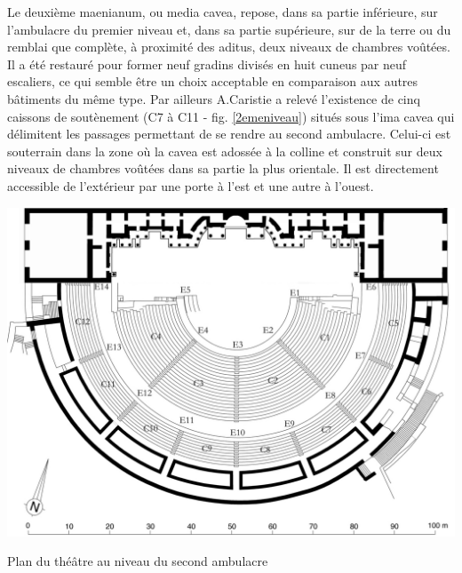 		
		Le deuxième \gls{maenianum}, ou  \gls{media cavea}, repose, dans sa partie inférieure, sur l'\gls{ambulacre} du premier niveau et, dans sa partie supérieure, sur de la terre ou du remblai que complète, à proximité des \gls{aditus}, deux niveaux de chambres voûtées. Il a été restauré pour former neuf gradins divisés en huit \gls{cuneus} par neuf escaliers, ce qui semble être un choix acceptable en comparaison aux autres bâtiments du même type. Par ailleurs A.Caristie a relevé l'existence de cinq caissons de soutènement (C7 à C11 - fig. \ref{2emeniveau}) situés sous l'\gls{ima cavea} qui délimitent les passages permettant de se rendre au second \gls{ambulacre}. Celui-ci est souterrain dans la zone où la \gls{cavea} est adossée à la colline et construit sur deux niveaux de chambres voûtées dans sa partie la plus orientale. Il est directement accessible de l'extérieur par une porte à l'est et une autre à l'ouest.
		
	\begin{figureth}
		\includegraphics[width=\linewidth]{images/2emeniveau}
		\caption[Vue de dessus - 2ème niveau]{Plan du théâtre au niveau du second \gls{ambulacre} \footnotemark }
		\label{2emeniveau}
	\end{figureth}		
		
